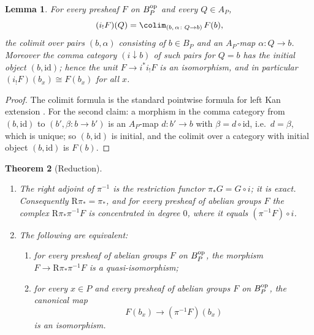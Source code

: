 \documentclass[11pt]{amsart}
\theoremstyle{plain}
\newtheorem{theorem}{Theorem}[section]
\newtheorem{lemma}[theorem]{Lemma}
\theoremstyle{remark}
\theoremstyle{definition}
\numberwithin{equation}{section}
\begin{document}
\begin{lemma}\label{lem:kan}
For every presheaf $F$ on $B_P^{\rm op}$ and every $Q\in A_P$,
\[
(i_!F)(Q)=\colim_{(b,\,\alpha\colon Q\to b)\,}F(b),
\]
the colimit over pairs $(b,\alpha)$ consisting of $b\in B_P$ and an
$A_P$-map $\alpha\colon Q\to b$.  Moreover the comma category
$(i\downarrow b)$ of such pairs for $Q=b$ has the initial object
$(b,\mathrm{id})$; hence the unit $F\to i^*i_!F$ is an isomorphism, and in
particular $(i_!F)(b_x)\cong F(b_x)$ for all $x$.
\end{lemma}
\begin{proof}
The colimit formula is the standard pointwise formula for left Kan
extension \cite{MM}.  For the second claim: a morphism in the comma
category from $(b,\mathrm{id})$ to $(b',\beta\colon b\to b')$ is an
$A_P$-map $d\colon b'\to b$ with $\beta=d\circ\mathrm{id}$, i.e.\
$d=\beta$, which is unique; so $(b,\mathrm{id})$ is initial, and the
colimit over a category with initial object $(b,\mathrm{id})$ is
$F(b)$.
\end{proof}

\begin{theorem}[Reduction]\label{thm:reduction}
\begin{enumerate}
\item The right adjoint of $\pi^{-1}$ is the restriction functor
$\pi_*G=G\circ i$; it is exact.  Consequently
$\mathrm R\pi_*=\pi_*$, and for every presheaf of abelian groups $F$ the
complex $\mathrm R\pi_*\pi^{-1}F$ is concentrated in degree $0$, where it
equals $(\pi^{-1}F)\circ i$.
\item The following are equivalent:
\begin{enumerate}
\item for every presheaf of abelian groups $F$ on $B_P^{\rm op}$, the
morphism $F\to\mathrm R\pi_*\pi^{-1}F$ is a quasi-isomorphism;
\item[$(\star)$] for every $x\in P$ and every presheaf of abelian groups
$F$ on $B_P^{\rm op}$, the canonical map
\[
F(b_x)\longrightarrow(\pi^{-1}F)(b_x)
\]
is an isomorphism.
\end{enumerate}
\end{enumerate}
\end{theorem}
\end{document}
